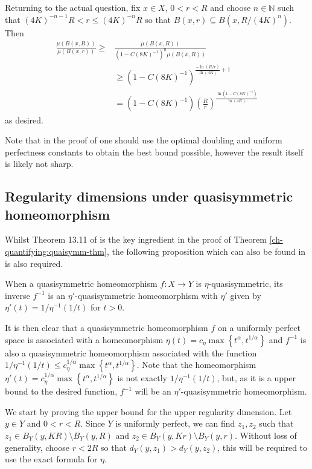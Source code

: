 	Returning to the actual question, fix $x\in X$, $0 < r < R$ and choose $n\in \mathbb{N}$ such that $(4K)^{-n-1}R < r \le (4K)^{-n}R$ so that $B(x,r) \subseteq B(x,R/(4K)^{n})$. Then
	\begin{align*}
	\frac{\mu(B(x,R))}{\mu(B(x,r))} \ge& \frac{\mu(B(x,R))}{(1-C(8K)^{-1})^n\mu(B(x,R))} \\
	& \ge (1-C(8K)^{-1})^{\frac{-\ln(R/r)}{\ln(4K)} + 1}\\
	& = (1-C(8K)^{-1})\left(\frac{R}{r}\right)^{\frac{\ln(1-C(8K)^{-1})}{\ln(4K)}}
	\end{align*}
	as desired.
	
Note that in the proof of \cite{gromov} one should use the optimal doubling and uniform perfectness constants to obtain the best bound possible, however the result itself is likely not sharp.






\subsection{Regularity dimensions under quasisymmetric homeomorphism}


Whilst Theorem 13.11 of \cite{heinonen} is the key ingredient in the proof of Theorem \ref{ch-quantifying:quaisymm-thm}, the following proposition which can also be found in \cite{heinonen} is also required.

\begin{proposition}
	When a quasisymmetric homeomorphism $f\colon X \rightarrow Y$ is $\eta$-quasisymmetric, its inverse $f^{-1}$ is an $\eta'$-quasisymmetric homeomorphism with $\eta'$ given by  $\eta'(t) = 1/\eta^{-1}(1/t)$ for $t>0$.
\end{proposition}

It is then clear that a quasisymmetric homeomorphism $f$ on a uniformly perfect space is associated with a homeomorphism $\eta(t) = c_\eta\max\left\{t^\alpha, t^{1/\alpha}\right\}$ and $f^{-1}$ is also a quasisymmetric homeomorphism associated with the function $1/\eta^{-1}(1/t) \le c_\eta^{1/\alpha} \max\left\{t^\alpha, t^{1/\alpha} \right\}$. Note that the homeomorphism $\eta'(t) = c_\eta^{1/\alpha} \max\left\{t^\alpha, t^{1/\alpha} \right\}$ is not exactly $1/\eta^{-1}(1/t)$, but, as it is a upper bound to the desired function, $f^{-1}$ will be an $\eta'$-quasisymmetric homeomorphism.



We start by proving the upper bound for the upper regularity dimension. Let $y\in Y$ and $0<r<R$. Since $Y$ is uniformly perfect, we can find $z_1,z_2$ such that $z_1\in B_Y(y,KR) \setminus B_Y(y,R)$ and $z_2 \in B_Y(y,Kr) \setminus B_Y(y,r)$. Without loss of generality, choose $ r < 2R $ so that $d_Y(y,z_1) > d_Y(y,z_2)$,  this will be required to use the exact formula for $\eta$.
	

